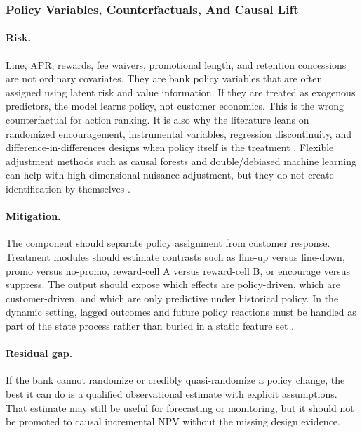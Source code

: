 \documentclass[11pt]{article}
\newcommand{\1}{\mathbf{1}}
\begin{document}
\subsubsection{Policy Variables, Counterfactuals, And Causal Lift}

\paragraph{Risk.}
Line, APR, rewards, fee waivers, promotional length, and retention concessions
are not ordinary covariates. They are bank policy variables that are often
assigned using latent risk and value information. If they are treated as
exogenous predictors, the model learns policy, not customer economics. This is
the wrong counterfactual for action ranking. It is also why the literature
leans on randomized encouragement, instrumental variables, regression
discontinuity, and difference-in-differences designs when policy itself is
the treatment \citep{angristimbensrubin1996iv,lee2010rd,
callaway2021did,sun2021eventstudy}. Flexible adjustment methods such as
causal forests and double/debiased machine learning can help with
high-dimensional nuisance adjustment, but they do not create identification by
themselves \citep{wager2018causalforests,chernozhukov2018dml}.

\paragraph{Mitigation.}
The component should separate policy assignment from customer response.
Treatment modules should estimate contrasts such as line-up versus line-down,
promo versus no-promo, reward-cell A versus reward-cell B, or encourage
versus suppress. The output should expose which effects are policy-driven,
which are customer-driven, and which are only predictive under historical
policy. In the dynamic setting, lagged outcomes and future policy reactions
must be handled as part of the state process rather than buried in a static
feature set \citep{arellano1991panel,blundell1998initial,rust1987replacement}.

\paragraph{Residual gap.}
If the bank cannot randomize or credibly quasi-randomize a policy change, the
best it can do is a qualified observational estimate with explicit assumptions.
That estimate may still be useful for forecasting or monitoring, but it should
not be promoted to causal incremental NPV without the missing design evidence.
\end{document}
